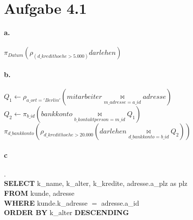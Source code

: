 \documentclass{article}
\begin{document}
	
	
	
	
	
	\section*{Aufgabe 4.1}
		\paragraph*{a.}
			$\pi_{Datum}(\rho_{(d\_kredithoehe>5.000)} darlehen)$
			
		\paragraph*{b.}
			$Q_1 \leftarrow \rho_{a\_ort = 'Berlin'}(mitarbeiter \underset{m\_adresse = a\_id}{\bowtie} adresse)$ \\[1.2em]
			
			$Q_2 \leftarrow \pi_{b\_id}(bankkonto \underset{b\_kontaktperson = m\_id}{\bowtie} Q_1)$
			\\[1.2em]
			
			$\pi_{d\_bankkonto}(\rho_{d\_kredithoehe > 20.000}(darlehen \underset{d\_bankkonto = b\_id}{\bowtie} Q_2))$\\
			
			
		\paragraph*{c}.\\
			\textbf{SELECT} k\_name, k\_alter, k\_kredite, adresse.a\_plz as plz\\
			\textbf{FROM} kunde, adresse\\
			\textbf{WHERE} kunde.k\_adresse $ = $ adresse.a\_id\\
			\textbf{ORDER BY} k\_alter \textbf{DESCENDING}
			
\end{document}
